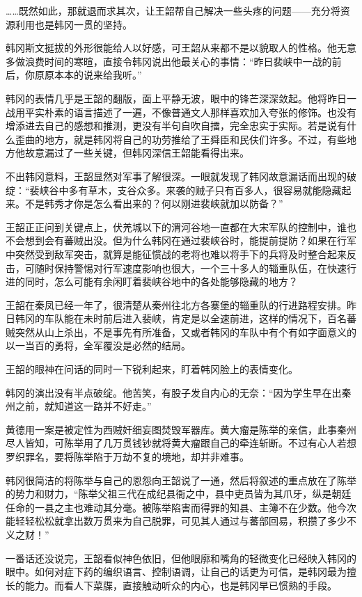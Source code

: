……既然如此，那就退而求其次，让王韶帮自己解决一些头疼的问题——充分将资源利用也是韩冈一贯的坚持。

韩冈斯文挺拔的外形很能给人以好感，可王韶从来都不是以貌取人的性格。他无意多做浪费时间的寒暄，直接令韩冈说出他最关心的事情：“昨日裴峡中一战的前后，你原原本本的说来给我听。”

韩冈的表情几乎是王韶的翻版，面上平静无波，眼中的锋芒深深敛起。他将昨日一战用平实朴素的语言描述了一遍，不像普通文人那样喜欢加入夸张的修饰。也没有增添进去自己的感想和推测，更没有半句自吹自擂，完全忠实于实际。若是说有什么歪曲的地方，就是韩冈将自己的功劳推给了王舜臣和民伕们许多。不过，有些地方他故意漏过了一些关键，但韩冈深信王韶能看得出来。

不出韩冈意料，王韶显然对军事了解很深。一眼就发现了韩冈故意漏话而出现的破绽：“裴峡谷中多有草木，支谷众多。来袭的贼子只有百多人，很容易就能隐藏起来。不是韩秀才你是怎么看出来的？何以刚进裴峡就加以防备？”

王韶正正问到关键点上，伏羌城以下的渭河谷地一直都在大宋军队的控制中，谁也不会想到会有蕃贼出没。但为什么韩冈在通过裴峡谷时，能提前提防？如果在行军中突然受到敌军突击，就算是能征惯战的老将也难以将手下的兵将及时整合起来反击，可随时保持警惕对行军速度影响也很大，一个三十多人的辎重队伍，在快速行进的同时，怎么可能有余闲盯着裴峡谷地中的各处能够隐藏的地方？

王韶在秦凤已经一年了，很清楚从秦州往北方各寨堡的辎重队的行进路程安排。昨日韩冈的车队能在未时前后进入裴峡，肯定是以全速前进，这样的情况下，百名蕃贼突然从山上杀出，不是事先有所准备，又或者韩冈的车队中有个有如字面意义的以一当百的勇将，全军覆没是必然的结局。

王韶的眼神在问话的同时一下锐利起来，盯着韩冈脸上的表情变化。

韩冈的演出没有半点破绽。他苦笑，有股子发自内心的无奈：“因为学生早在出秦州之前，就知道这一路并不好走。”

黄德用一案是被定性为西贼奸细妄图焚毁军器库。黄大瘤是陈举的亲信，此事秦州尽人皆知，可陈举用了几万贯钱钞就将黄大瘤跟自己的牵连斩断。不过有心人若想罗织罪名，要将陈举陷于万劫不复的境地，却并非难事。

韩冈很简洁的将陈举与自己的恩怨向王韶说了一通，然后将叙述的重点放在了陈举的势力和财力，“陈举父祖三代在成纪县衙之中，县中吏员皆为其爪牙，纵是朝廷任命的一县之主也难动其分毫。被陈举陷害而得罪的知县、主簿不在少数。他今次能轻轻松松就拿出数万贯来为自己脱罪，可见其人通过与蕃部回易，积攒了多少不义之财！”

一番话还没说完，王韶看似神色依旧，但他眼廓和嘴角的轻微变化已经映入韩冈的眼中。如何对症下药的编织语言、控制语调，让自己的话更为可信，是韩冈最为擅长的能力。而看人下菜牒，直接触动听众的内心，也是韩冈早已惯熟的手段。

